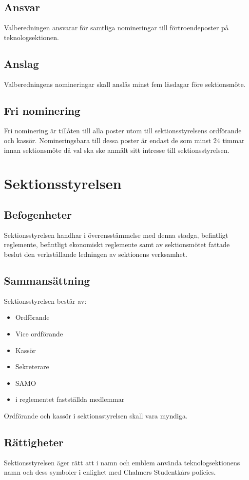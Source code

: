 \documentclass[a4paper]{dtek}
\begin{document}
\subsection{Ansvar}
Valberedningen ansvarar för samtliga nomineringar till förtroendeposter på teknologsektionen.
\subsection{Anslag}
Valberedningens nomineringar skall anslås minst fem läsdagar före sektionsmöte.
\subsection{Fri nominering}
Fri nominering är tillåten till alla poster utom till sektionsstyrelsens ordförande och kassör. Nomineringsbara till dessa poster är endast de som minst 24 timmar innan sektionsmöte då val ska ske anmält sitt intresse till sektionsstyrelsen.
\newpage

\section{Sektionsstyrelsen}
\subsection{Befogenheter}
Sektionsstyrelsen handhar i överensstämmelse med denna stadga, befintligt reglemente, befintligt ekonomiskt reglemente samt av sektionsmötet fattade beslut den verkställande ledningen av sektionens verksamhet.
\subsection{Sammansättning}
Sektionsstyrelsen består av:
\begin{itemize}
\item Ordförande
\item Vice ordförande
\item Kassör
\item Sekreterare
\item SAMO
\item i reglementet fastställda medlemmar
\end{itemize}
Ordförande och kassör i sektionsstyrelsen skall vara myndiga.
\subsection{Rättigheter}
Sektionsstyrelsen äger rätt att i namn och emblem använda teknologsektionens namn och dess symboler i enlighet med Chalmers Studentkårs policies.
\end{document}
